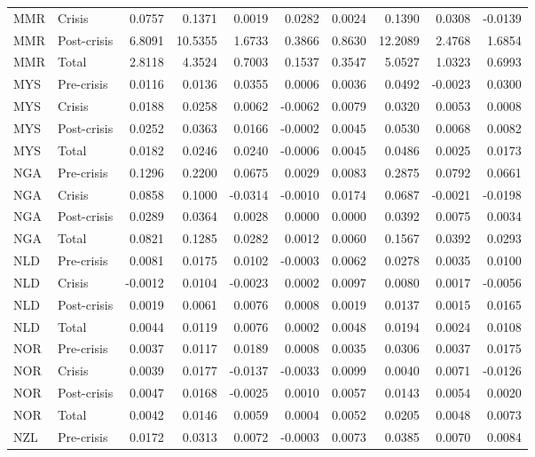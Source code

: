\begin{longtable}[t]{llrrrrrrrr}
MMR & Crisis & 0.0757 & 0.1371 & 0.0019 & 0.0282 & 0.0024 & 0.1390 & 0.0308 & -0.0139\\
MMR & Post-crisis & 6.8091 & 10.5355 & 1.6733 & 0.3866 & 0.8630 & 12.2089 & 2.4768 & 1.6854\\
MMR & Total & 2.8118 & 4.3524 & 0.7003 & 0.1537 & 0.3547 & 5.0527 & 1.0323 & 0.6993\\
\addlinespace
MYS & Pre-crisis & 0.0116 & 0.0136 & 0.0355 & 0.0006 & 0.0036 & 0.0492 & -0.0023 & 0.0300\\
MYS & Crisis & 0.0188 & 0.0258 & 0.0062 & -0.0062 & 0.0079 & 0.0320 & 0.0053 & 0.0008\\
MYS & Post-crisis & 0.0252 & 0.0363 & 0.0166 & -0.0002 & 0.0045 & 0.0530 & 0.0068 & 0.0082\\
MYS & Total & 0.0182 & 0.0246 & 0.0240 & -0.0006 & 0.0045 & 0.0486 & 0.0025 & 0.0173\\
NGA & Pre-crisis & 0.1296 & 0.2200 & 0.0675 & 0.0029 & 0.0083 & 0.2875 & 0.0792 & 0.0661\\
\addlinespace
NGA & Crisis & 0.0858 & 0.1000 & -0.0314 & -0.0010 & 0.0174 & 0.0687 & -0.0021 & -0.0198\\
NGA & Post-crisis & 0.0289 & 0.0364 & 0.0028 & 0.0000 & 0.0000 & 0.0392 & 0.0075 & 0.0034\\
NGA & Total & 0.0821 & 0.1285 & 0.0282 & 0.0012 & 0.0060 & 0.1567 & 0.0392 & 0.0293\\
NLD & Pre-crisis & 0.0081 & 0.0175 & 0.0102 & -0.0003 & 0.0062 & 0.0278 & 0.0035 & 0.0100\\
NLD & Crisis & -0.0012 & 0.0104 & -0.0023 & 0.0002 & 0.0097 & 0.0080 & 0.0017 & -0.0056\\
\addlinespace
NLD & Post-crisis & 0.0019 & 0.0061 & 0.0076 & 0.0008 & 0.0019 & 0.0137 & 0.0015 & 0.0165\\
NLD & Total & 0.0044 & 0.0119 & 0.0076 & 0.0002 & 0.0048 & 0.0194 & 0.0024 & 0.0108\\
NOR & Pre-crisis & 0.0037 & 0.0117 & 0.0189 & 0.0008 & 0.0035 & 0.0306 & 0.0037 & 0.0175\\
NOR & Crisis & 0.0039 & 0.0177 & -0.0137 & -0.0033 & 0.0099 & 0.0040 & 0.0071 & -0.0126\\
NOR & Post-crisis & 0.0047 & 0.0168 & -0.0025 & 0.0010 & 0.0057 & 0.0143 & 0.0054 & 0.0020\\
\addlinespace
NOR & Total & 0.0042 & 0.0146 & 0.0059 & 0.0004 & 0.0052 & 0.0205 & 0.0048 & 0.0073\\
NZL & Pre-crisis & 0.0172 & 0.0313 & 0.0072 & -0.0003 & 0.0073 & 0.0385 & 0.0070 & 0.0084\\

\end{longtable}
